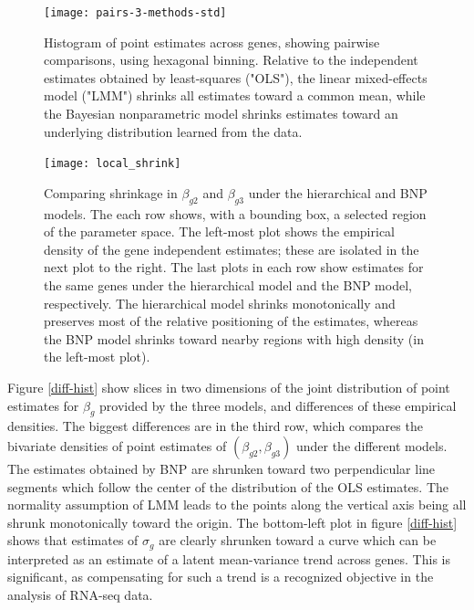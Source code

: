 {\begin{figure}[ht]
\centering
\texttt{[image: pairs-3-methods-std]}
\caption{Histogram of point estimates across genes, showing pairwise comparisons, using hexagonal binning. Relative to the independent estimates obtained by least-squares ("OLS"), the linear mixed-effects model ("LMM") shrinks all estimates toward a common mean, while the Bayesian nonparametric model shrinks estimates toward an underlying distribution learned from the data.}
\label{pairs-3-methods}
\end{figure}

\begin{figure}
\centering
\texttt{[image: local\_shrink]}
\caption{\small Comparing shrinkage in $\beta_{g2}$ and $\beta_{g3}$ under the hierarchical and BNP models. The each row shows, with a bounding box, a selected region of the parameter space. The left-most plot shows the empirical density of the gene independent estimates; these are isolated in the next plot to the right. The last plots in each row show estimates for the same genes under the hierarchical model and the BNP model, respectively. The hierarchical model shrinks monotonically and preserves most of the relative positioning of the estimates, whereas the BNP model shrinks toward nearby regions with high density (in the left-most plot).}
\label{method-compare}
\end{figure}



Figure \ref{diff-hist} show slices in two dimensions of the joint distribution of point estimates for $\beta_g$ provided by the three models, and differences of these empirical densities. The biggest differences are in the third row, which compares the bivariate densities of point estimates of $(\beta_{g2},\beta_{g3})$ under the different models. The estimates obtained by BNP are shrunken toward two perpendicular line segments which follow the center of the distribution of the OLS estimates. The normality assumption of LMM leads to the points along the vertical axis being all shrunk monotonically toward the origin. The bottom-left plot in figure \ref{diff-hist} shows that estimates of $\sigma_g$ are clearly shrunken toward a curve which can be interpreted as an estimate of a latent mean-variance trend across genes. This is significant, as compensating for such a trend is a recognized objective in the analysis of RNA-seq data.



}
